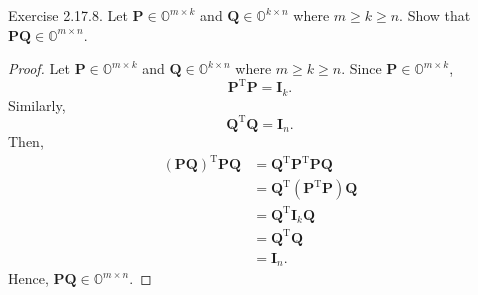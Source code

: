 \documentclass{article}
\theoremstyle{plain}
\begin{document}
\begin{itembox}[l]{Exercise 2.17.8.}
	Let
	\begin{math}
		\bm{P} \in \mathbb{O}^{m \times k}
	\end{math}
	and
	\begin{math}
		\bm{Q} \in \mathbb{O}^{k \times n}
	\end{math}
	where $m \geq k \geq n$. Show that $\bm{PQ} \in \mathbb{O}^{m \times n}$.
	
	
\end{itembox}


\begin{proof}
	Let
	\begin{math}
		\bm{P} \in \mathbb{O}^{m \times k}
	\end{math}
	and
	\begin{math}
		\bm{Q} \in \mathbb{O}^{k \times n}
	\end{math}
	where $m \geq k \geq n$.
	Since $\bm{P} \in \mathbb{O}^{m \times k}$,
	\begin{equation*}
		\bm{P}^{\mathrm{T}} \bm{P} = \bm{I}_k .
	\end{equation*}
	Similarly,
	\begin{equation*}
		\bm{Q}^{\mathrm{T}} \bm{Q} = \bm{I}_n .
	\end{equation*}
	Then,
	\begin{equation*}
		\begin{split}
			(\bm{PQ})^{\mathrm{T}} \bm{PQ} &= \bm{Q}^{\mathrm{T}} \bm{P}^{\mathrm{T}} \bm{PQ} \\
			&= \bm{Q}^{\mathrm{T}} (\bm{P}^{\mathrm{T}} \bm{P}) \bm{Q} \\
			&= \bm{Q}^{\mathrm{T}} \bm{I}_k \bm{Q} \\
			&= \bm{Q}^{\mathrm{T}} \bm{Q} \\
			&= \bm{I}_n .
		\end{split}
	\end{equation*}
	Hence, $\bm{PQ} \in \mathbb{O}^{m \times n}$.
\end{proof}
\end{document}
